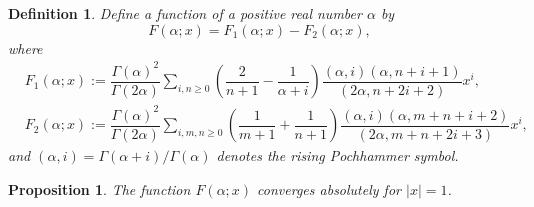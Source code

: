 \documentclass[11pt,a4,leqno]{amsart}
\theoremstyle{my theoremstyle}
\newtheorem{prop}[thm]{Proposition}
\theoremstyle{dfn}
\newtheorem{dfn}[thm]{Definition}
\theoremstyle{remark}
\renewcommand{\1}{\mathbbm{1}}
\newcommand{\al}{\alpha}
\numberwithin{equation}{section}
\begin{document}
\begin{dfn}
Define a function of a positive real number $\al$ by 
$$F(\al;  x)=  F_1(\al; x)-F_2(\al; x), $$
where 
\begin{align*}
&F_1(\al; x):=\dfrac{\Gamma\left(\al \right)^2}{\Gamma\left(2 \al \right)}\sum_{i, n \ge 0} \left(\dfrac{2}{n+1} - \dfrac{1}{\al+i} \right) \dfrac{(\al, i)(\al, n+i+1)}{(2\al, n+2i+2)} x^i, \\
&F_2(\al; x):=\dfrac{\Gamma\left(\al \right)^2}{\Gamma\left(2\al \right)}\sum_{i, m, n \ge 0} \left(\dfrac1{m+1} + \dfrac1{n+1} \right) \dfrac{(\al, i)(\al, m+n+i+2) }{(2\al, m+n+2i+3)} x^i, 
\end{align*}
and $(\al, i) = \Gamma(\al+i)/\Gamma(\al)$ denotes the rising Pochhammer symbol. 
\end{dfn}

\begin{prop} \label{convergence}
The function $F(\alpha; x)$ converges absolutely for $|x|=1$. 
\end{prop}
\end{document}
